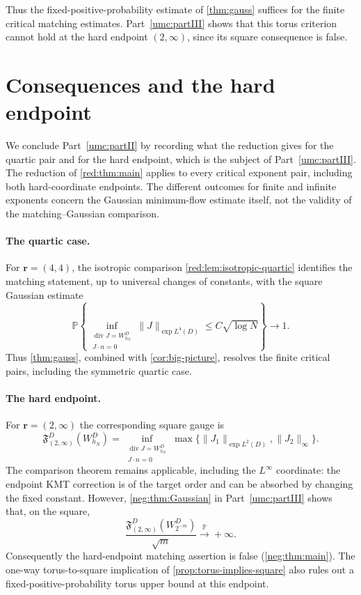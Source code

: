 \documentclass[11pt]{article}
\theoremstyle{definition}
\theoremstyle{remark}
\numberwithin{equation}{section}
\begin{document}
Thus the fixed-positive-probability estimate of \cref{thm:gauss}
suffices for the finite critical matching estimates.
Part~\ref{umc:partIII} shows that this torus criterion cannot hold at
the hard endpoint $(2,\infty)$, since its square consequence is false.

\section{Consequences and the hard endpoint}
\label{red:sec:consequences}

We conclude Part~\ref{umc:partII} by recording what the reduction gives
for the quartic pair and for the hard endpoint, which is the subject of
Part~\ref{umc:partIII}.
The reduction of \cref{red:thm:main} applies to every critical exponent pair,
including both hard-coordinate endpoints. The different outcomes for finite
and infinite exponents concern the Gaussian minimum-flow estimate itself,
not the validity of the matching--Gaussian comparison.

\paragraph{The quartic case.}
For $\boldsymbol r=(4,4)$, the isotropic comparison
\cref{red:lem:isotropic-quartic} identifies the matching statement, up to
universal changes of constants, with the square Gaussian estimate
\[
 \mathbb P\!\left\{
 \inf_{\substack{\operatorname{div}J=W_{h_N}^{D}\\J\cdot n=0}}
    \|J\|_{\exp L^4(D)}\le C\sqrt{\log N}\right\}
 \longrightarrow 1.
\]
Thus \cref{thm:gauss}, combined with \cref{cor:big-picture}, resolves the
finite critical pairs, including the symmetric quartic case.

\paragraph{The hard endpoint.}
For $\boldsymbol r=(2,\infty)$ the corresponding square gauge is
\[
 \mathfrak F_{(2,\infty)}^D(W_{h_N}^{D})
 =\inf_{\substack{\operatorname{div}J=W_{h_N}^{D}\\J\cdot n=0}}
 \max\{\|J_1\|_{\exp L^2(D)},\|J_2\|_{\infty}\}.
\]
The comparison theorem remains applicable, including the $L^\infty$
coordinate: the endpoint KMT correction is of the target order
and can be absorbed by changing the fixed constant. However,
\cref{neg:thm:Gaussian} in Part~\ref{umc:partIII} shows that, on the square,
\[
  \frac{\mathfrak F_{(2,\infty)}^D(W_{2^{-m}}^D)}{\sqrt m}
       \xrightarrow{\mathbb P}+\infty.
\]
Consequently the hard-endpoint matching assertion is false
(\cref{neg:thm:main}). The one-way torus-to-square implication of
\cref{prop:torus-implies-square} also rules out a
fixed-positive-probability torus upper bound at this endpoint.
\end{document}

